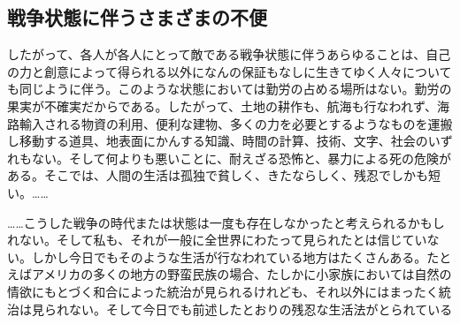 \subsection{戦争状態に伴うさまざまの不便}

したがって、各人が各人にとって敵である戦争状態に伴うあらゆることは、自己の力と創意によって得られる以外になんの保証もなしに生きてゆく人々についても同じように伴う。このような状態においては勤労の占める場所はない。勤労の果実が不確実だからである。したがって、土地の耕作も、航海も行なわれず、海路輸入される物資の利用、便利な建物、多くの力を必要とするようなものを運搬し移動する道具、地表面にかんする知識、時間の計算、技術、文字、社会のいずれもない。そして何よりも悪いことに、耐えざる恐怖と、暴力による死の危険がある。そこでは、人間の生活は孤独で貧しく、きたならしく、残忍でしかも短い。……








……こうした戦争の時代または状態は一度も存在しなかったと考えられるかもしれない。そして私も、それが一般に全世界にわたって見られたとは信じていない。しかし今日でもそのような生活が行なわれている地方はたくさんある。たとえばアメリカの多くの地方の野蛮民族の場合、たしかに小家族においては自然の情欲にもとづく和合によった統治が見られるけれども、それ以外にはまったく統治は見られない。そして今日でも前述したとおりの残忍な生活法がとられている

